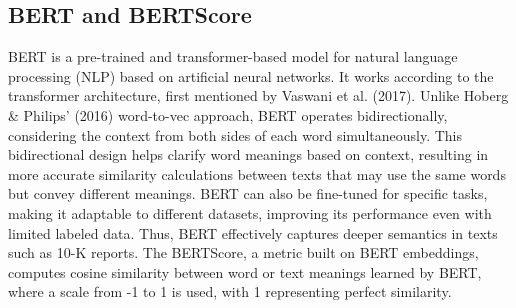 \documentclass[
]{article}
\begin{document}
\begin{table}[H]
\centering
\caption{\label{tab:tbl-table1}10-K Sample Creation}
\centering
{}
\end{table}

\subsection{BERT and BERTScore}\label{bert-and-bertscore}

BERT is a pre-trained and transformer-based model for natural language
processing (NLP) based on artificial neural networks. It works according
to the transformer architecture, first mentioned by Vaswani et al.
(2017). Unlike Hoberg \& Philips' (2016) word-to-vec approach, BERT
operates bidirectionally, considering the context from both sides of
each word simultaneously. This bidirectional design helps clarify word
meanings based on context, resulting in more accurate similarity
calculations between texts that may use the same words but convey
different meanings. BERT can also be fine-tuned for specific tasks,
making it adaptable to different datasets, improving its performance
even with limited labeled data. Thus, BERT effectively captures deeper
semantics in texts such as 10-K reports. The BERTScore, a metric built
on BERT embeddings, computes cosine similarity between word or text
meanings learned by BERT, where a scale from -1 to 1 is used, with 1
representing perfect similarity.
\end{document}
